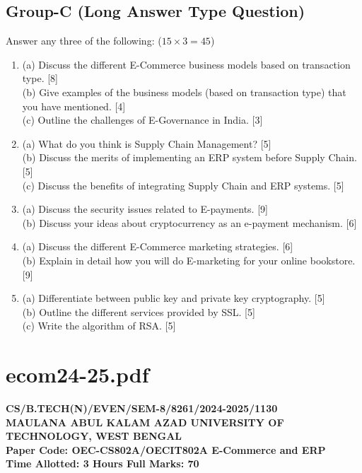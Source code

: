 \subsection*{Group-C (Long Answer Type Question)}
Answer any three of the following: ($15 \times 3 = 45$)
\begin{enumerate}
    \item[7.] 
    (a) Discuss the different E-Commerce business models based on transaction type. [8] \\
    (b) Give examples of the business models (based on transaction type) that you have mentioned. [4] \\
    (c) Outline the challenges of E-Governance in India. [3]
    \item[8.] 
    (a) What do you think is Supply Chain Management? [5] \\
    (b) Discuss the merits of implementing an ERP system before Supply Chain. [5] \\
    (c) Discuss the benefits of integrating Supply Chain and ERP systems. [5]
    \item[9.] 
    (a) Discuss the security issues related to E-payments. [9] \\
    (b) Discuss your ideas about cryptocurrency as an e-payment mechanism. [6]
    \item[10.] 
    (a) Discuss the different E-Commerce marketing strategies. [6] \\
    (b) Explain in detail how you will do E-marketing for your online bookstore. [9]
    \item[11.] 
    (a) Differentiate between public key and private key cryptography. [5] \\
    (b) Outline the different services provided by SSL. [5] \\
    (c) Write the algorithm of RSA. [5]
\end{enumerate}


\newpage
\section*{ecom24-25.pdf}
\textbf{CS/B.TECH(N)/EVEN/SEM-8/8261/2024-2025/1130} \\
\textbf{MAULANA ABUL KALAM AZAD UNIVERSITY OF TECHNOLOGY, WEST BENGAL} \\
\textbf{Paper Code: OEC-CS802A/OECIT802A \hfill E-Commerce and ERP} \\
\textbf{Time Allotted: 3 Hours \hfill Full Marks: 70}

